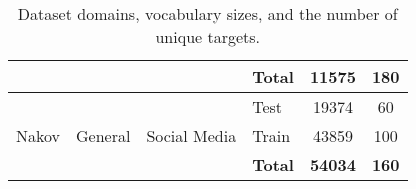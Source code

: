 \documentclass[../../fyp.tex]{subfiles}
\begin{document}
\begin{table}
\begin{tabular}{|l|l|l|l|c|c|}
		                                       &                                      &                                    & \textbf{Total}                      & \textbf{11575}                     & \textbf{180}                       \\ \hline\hline
		\multirow{3}{*}{Nakov}                 & \multirow{3}{*}{General}             & \multirow{3}{*}{Social Media}      & Test                                & 19374                              & 60                                 \\
		                                       &                                      &                                    & Train                               & 43859                              & 100                                \\ \cline{4-6}
		                                       &                                      &                                    & \textbf{Total}                      & \textbf{54034}                     & \textbf{160}                       \\ \hline
	\end{tabular}
	\caption{Dataset domains, vocabulary sizes, and the number of unique targets.}
	\label{tab:dataset_domain_vocab}
\end{table}
\end{document}
